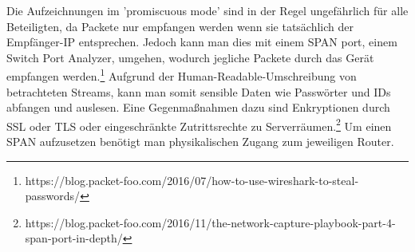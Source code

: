 \documentclass[11pt]{article}
\begin{document}
    Die Aufzeichnungen im 'promiscuous mode' sind in der Regel ungefährlich für alle Beteiligten, da Packete nur empfangen werden wenn sie
    tatsächlich der Empfänger-IP entsprechen. Jedoch kann man dies mit einem SPAN port, einem Switch Port Analyzer, umgehen, wodurch
    jegliche Packete durch das Gerät empfangen werden.\footnote[2]{https://blog.packet-foo.com/2016/07/how-to-use-wireshark-to-steal-passwords/}
    Aufgrund der Human-Readable-Umschreibung von betrachteten Streams, kann man somit sensible Daten wie Passwörter und IDs abfangen und auslesen.
    Eine Gegenmaßnahmen dazu sind Enkryptionen durch SSL oder TLS oder eingeschränkte Zutrittsrechte zu Serverräumen.\footnote[3]{https://blog.packet-foo.com/2016/11/the-network-capture-playbook-part-4-span-port-in-depth/}
    Um einen SPAN aufzusetzen benötigt man physikalischen Zugang zum jeweiligen Router.
\end{document}
